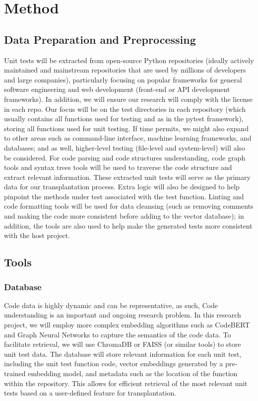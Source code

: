 \documentclass[sigconf]{acmart}
\begin{document}
\section{Method}
\subsection{Data Preparation and Preprocessing}
%
Unit tests will be extracted from open-source Python repositories (ideally actively maintained and mainstream repositories that are used by millions of developers and large companies), particularly focusing on popular frameworks for general software engineering and web development (front-end or API development frameworks).
%
In addition, we will ensure our research will comply with the license in each repo.
%
Our focus will be on the test directories in each repository (which usually contains all functions used for testing and as in the pytest framework), storing all functions used for unit testing. If time permits, we might also expand to other areas such as command-line interface, machine learning frameworks, and databases; and as well, higher-level testing (file-level and system-level) will also be considered.
%
For code parsing and code structures understanding, code graph tools and syntax trees tools will be used to traverse the code structure and extract relevant information.
%
These extracted unit tests will serve as the primary data for our transplantation process. Extra logic will also be designed to help pinpoint the methods under test associated with the test function.
%
Linting and code formatting tools will be used for data cleansing (such as removing comments and making the code more consistent before adding to the vector database); in addition, the tools are also used to help make the generated tests more consistent with the host project.

\subsection{Tools}
\subsubsection{Database}
Code data is highly dynamic and can be representative, as such, Code understanding is an important and ongoing research problem. In this research project, we will employ more complex embedding algorithms such as CodeBERT and Graph Neural Networks to capture the semantics of the code data. To facilitate retrieval, we will use ChromaDB or FAISS (or similar tools) to store unit test data. The database will store relevant information for each unit test, including the unit test function code, vector embeddings generated by a pre-trained embedding model, and metadata such as the location of the function within the repository. This allows for efficient retrieval of the most relevant unit tests based on a user-defined feature for transplantation.
\end{document}

